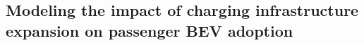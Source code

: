         \subsection{Modeling the impact of charging infrastructure expansion on passenger \ac{BEV} adoption}

